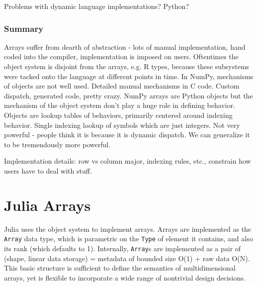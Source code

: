 \documentclass[preprint]{sigplanconf}
\newcommand{\code}[1]{\texttt{#1}}
\begin{document}




Problems with dynamic language implementations? Python?

\subsubsection{Summary}

Arrays suffer from dearth of abstraction - lots of manual implementation, hand
coded into the compiler, implementation is imposed on users. Oftentimes the
object system is disjoint from the arrays, e.g. R types, because these
subsystems were tacked onto the language at different points in time. In
NumPy, mechanisms of objects are not well used. Detailed manual mechanisms in
C code. Custom dispatch, generated code, pretty crazy. NumPy arrays are Python
objects but the mechanism of the object system don't play a huge role in
defining behavior. Objects are lookup tables of behaviors, primarily centered
around indexing behavior. Single indexing lookup of symbols which are just
integers. Not very powerful - people think it is because it is dynamic
dispatch. We can generalize it to be tremendously more powerful.

Implementation details: row vs column major, indexing rules, etc., constrain
how users have to deal with stuff.

\section{Julia Arrays}

Julia uses the object system to implement arrays. Arrays are implemented as
the \code{Array} data type, which is parametric on the \code{Type} of element
it contains, and also its rank (which defaults to 1). Internally,
\code{Array}s are implemented as a pair of (shape, linear data storage) =
metadata of bounded size O(1) + raw data O(N). This basic structure is
sufficient to define the semantics of multidimensional arrays, yet is flexible
to incorporate a wide range of nontrivial design decisions.
\end{document}
